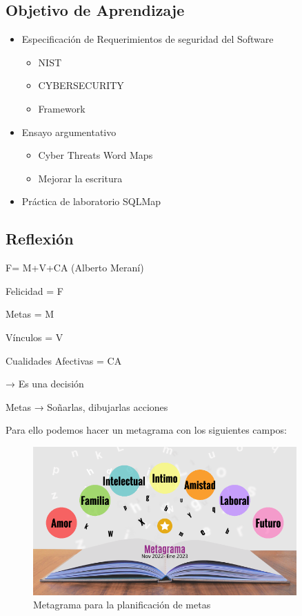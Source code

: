 \documentclass[12pt,a4paper]{article}
\begin{document}
\subsection{Objetivo de Aprendizaje}
\begin{itemize}
    \item Especificación de Requerimientos de seguridad del Software
    \begin{itemize}
        \item NIST
        \item CYBERSECURITY
        \item Framework
    \end{itemize}
    \item Ensayo argumentativo
    \begin{itemize}
        \item Cyber Threats Word Maps
        \item Mejorar la escritura
    \end{itemize}
    \item Práctica de laboratorio SQLMap
\end{itemize}

\subsection{Reflexión}
F= M+V+CA (Alberto Meraní)

Felicidad = F

Metas = M

Vínculos = V

Cualidades Afectivas = CA

→ Es una decisión

Metas → Soñarlas, dibujarlas acciones

Para ello podemos hacer un metagrama con los siguientes campos:

\begin{figure}[H]
\centering
\includegraphics[width=0.9\textwidth]{metagrama.png}
\caption{Metagrama para la planificación de metas}
\label{fig:metagrama}
\end{figure}
\end{document}
